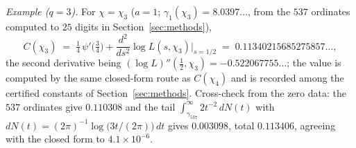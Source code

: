 \medskip\noindent\emph{Example ($q=3$).} For $\chi=\chi_3$ ($a=1$;
$\gamma_1(\chi_3)=8.0397\ldots$, from the $537$ ordinates computed to
$25$ digits in Section~\ref{sec:methods}),
\[
C(\chi_3)\;=\;\tfrac14\,\psi'\bigl(\tfrac34\bigr)
+\frac{d^2}{ds^2}\log L(s,\chi_3)\Big|_{s=1/2}
\;=\;0.11340215685275857\ldots,
\]
the second derivative being
$(\log L)''(\tfrac12,\chi_3)=-0.522067755\ldots$; the value is
computed by the same closed-form route as $C(\chi_4)$ and is recorded
among the certified constants of Section~\ref{sec:methods}.
Cross-check from the zero data: the $537$ ordinates give $0.110308$
and the tail $\int_{\gamma_{537}}^\infty 2t^{-2}\,dN(t)$ with
$dN(t)=(2\pi)^{-1}\log\bigl(3t/(2\pi)\bigr)\,dt$ gives $0.003098$,
total $0.113406$, agreeing with the closed form to
$4.1\times10^{-6}$.

